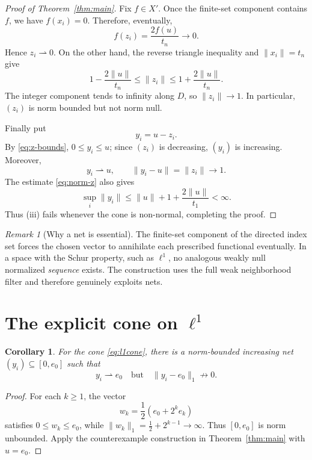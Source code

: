 \documentclass[11pt]{article}
\newtheorem{corollary}[theorem]{Corollary}
\theoremstyle{remark}
\newtheorem{remark}[theorem]{Remark}
\newcommand{\norm}[1]{\lVert #1\rVert}
\begin{document}
\begin{proof}[Proof of Theorem~\ref{thm:main}]
Fix $f\in X'$.  Once the finite-set component contains $f$, we have
$f(x_i)=0$.  Therefore, eventually,
\[
 f(z_i)=\frac{2f(u)}{t_n}\longrightarrow0.
\]
Hence $z_i\rightharpoonup0$.
On the other hand, the reverse triangle inequality and $\norm{x_i}=t_n$
give
\begin{equation}\label{eq:norm-z}
  1-\frac{2\norm{u}}{t_n}
  \leq \norm{z_i}
  \leq 1+\frac{2\norm{u}}{t_n}.
\end{equation}
The integer component tends to infinity along $D$, so
$\norm{z_i}\to1$.  In particular, $(z_i)$ is norm bounded but not norm
null.

Finally put
\[
 y_i=u-z_i.
\]
By \eqref{eq:z-bounds}, $0\leq y_i\leq u$; since $(z_i)$ is decreasing,
$(y_i)$ is increasing.  Moreover,
\[
 y_i\rightharpoonup u,
 \qquad
 \norm{y_i-u}=\norm{z_i}\longrightarrow1.
\]
The estimate \eqref{eq:norm-z} also gives
\[
 \sup_i\norm{y_i}
 \leq \norm{u}+1+\frac{2\norm{u}}{t_1}<\infty.
\]
Thus (iii) fails whenever the cone is non-normal, completing the proof.
\end{proof}

\begin{remark}[Why a net is essential]
The finite-set component of the directed index set forces the chosen vector
to annihilate each prescribed functional eventually.  In a space with the
Schur property, such as $\ell^1$, no analogous weakly null normalized
\emph{sequence} exists.  The construction uses the full weak neighborhood
filter and therefore genuinely exploits nets.
\end{remark}

\section{The explicit cone on \texorpdfstring{$\ell^1$}{l1}}

\begin{corollary}\label{cor:l1}
For the cone \eqref{eq:l1cone}, there is a norm-bounded increasing net
$(y_i)\subseteq[0,e_0]$ such that
\[
 y_i\rightharpoonup e_0
 \quad\text{but}\quad
 \norm{y_i-e_0}_1\not\longrightarrow0.
\]
\end{corollary}

\begin{proof}
For each $k\geq1$, the vector
\[
 w_k=\frac12(e_0+2^k e_k)
\]
satisfies $0\leq w_k\leq e_0$, while
$\norm{w_k}_1=\frac12+2^{k-1}\to\infty$.  Thus $[0,e_0]$ is norm
unbounded.  Apply the counterexample construction in
Theorem~\ref{thm:main} with $u=e_0$.
\end{proof}
\end{document}
